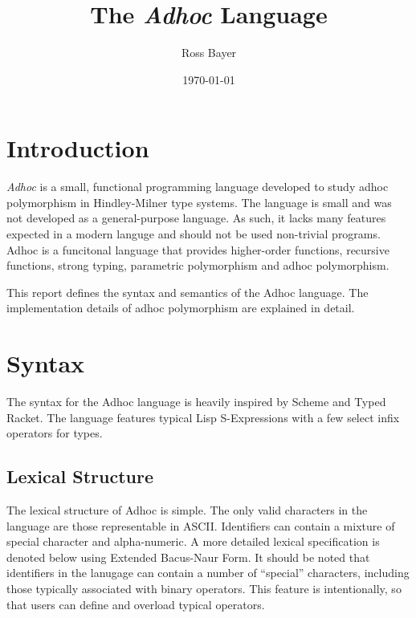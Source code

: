 \documentclass[11pt,a4paper]{article}
\title{The \textit{Adhoc} Language}
\author{Ross Bayer}
\date{\today}
\begin{document}
\maketitle



\section{Introduction}

\textit{Adhoc} is a small, functional programming language developed to study
adhoc polymorphism in Hindley-Milner type systems. The language is small and
was not developed as a general-purpose language. As such, it lacks many features
expected in a modern languge and should not be used non-trivial programs. Adhoc
is a funcitonal language that provides higher-order functions, recursive
functions, strong typing, parametric polymorphism and adhoc polymorphism.

This report defines the syntax and semantics of the Adhoc language. The
implementation details of adhoc polymorphism are explained in detail.



\section{Syntax}

The syntax for the Adhoc language is heavily inspired by Scheme and Typed
Racket. The language features typical Lisp S-Expressions with a few select infix
operators for types.


\subsection{Lexical Structure}

The lexical structure of Adhoc is simple. The only valid characters in the
language are those representable in ASCII. Identifiers can contain a mixture of
special character and alpha-numeric. A more detailed lexical specification is
denoted below using Extended Bacus-Naur Form. It should be noted that
identifiers in the lanugage can contain a number of ``special'' characters,
including those typically associated with binary operators. This feature is
intentionally, so that users can define and overload typical operators.
\end{document}
